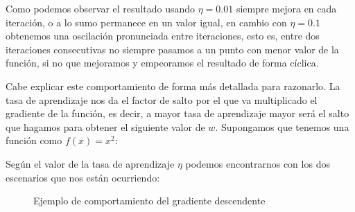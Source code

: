 \documentclass[12pt,a4paper]{article}
\begin{document}
Como podemos observar el resultado usando $\eta=0.01$ siempre mejora en cada iteración, o a lo sumo permanece en un valor igual, en cambio con $\eta=0.1$ obtenemos una oscilación pronunciada entre iteraciones, esto es, entre dos iteraciones consecutivas no siempre pasamos a un punto con menor valor de la función, si no que mejoramos y empeoramos el resultado de forma cíclica.

Cabe explicar este comportamiento de forma más detallada para razonarlo. La tasa de aprendizaje nos da el factor de salto por el que va multiplicado el gradiente de la función, es decir, a mayor tasa de aprendizaje mayor será el salto que hagamos para obtener el siguiente valor de $w$. Supongamos que tenemos una función como $f(x)=x^2$:

\begin{figure}[H]
	\centering
\end{figure}

Según el valor de la tasa de aprendizaje $\eta$ podemos encontrarnos con los dos escenarios que nos están ocurriendo:

\begin{figure}[H]
	\begin{subfigure}{0.45\textwidth}
		\centering
	\end{subfigure}
	\begin{subfigure}{0.45\textwidth}
		\centering
	\end{subfigure}
	\caption{Ejemplo de comportamiento del gradiente descendente}
	\label{descripcionEta}
\end{figure}
\end{document}
